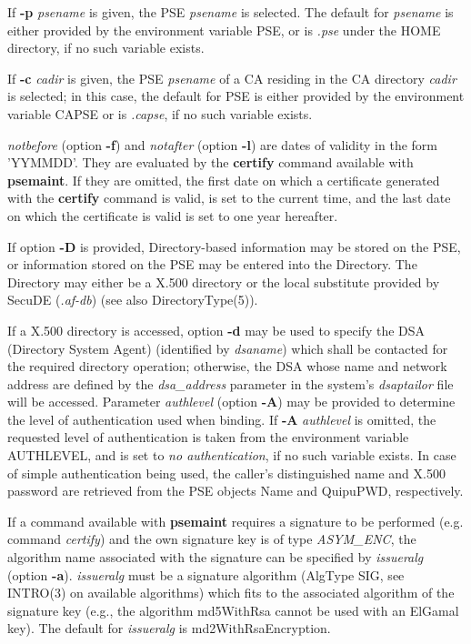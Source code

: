 If {\bf -p} {\em psename} is given, the PSE {\em psename} is selected. The default for
{\em psename} is either provided by the environment variable PSE, or is {\em .pse} under the
HOME directory, if no such variable exists.

If {\bf -c} {\em cadir} is given, the PSE {\em psename} of a CA residing in the CA directory {\em cadir}
is selected; in this case, the default for PSE is either provided by the environment
variable CAPSE or is {\em .capse}, if no such variable exists.

{\em notbefore} (option {\bf -f}) and {\em notafter} (option {\bf -l}) are dates of validity in the 
form 'YYMMDD'. They are evaluated by the {\bf certify} command available with {\bf psemaint}. 
If they are omitted, the first date on which a certificate generated with the {\bf certify} command
is valid, is set to the current time, 
and the last date on which the certificate is valid is set to one year hereafter.

If option {\bf -D} is provided, Directory-based information may be stored on the PSE, or
information stored on the PSE may be entered into the Directory.
The Directory may either be a 
X.500 directory or the local substitute provided by 
SecuDE ({\em .af-db}) (see also DirectoryType(5)).

If a X.500 directory is accessed, option {\bf -d} may be used to specify the DSA (Directory System 
Agent) 
(identified by {\em dsaname}) which shall be contacted for the required directory operation; otherwise, the DSA whose name and network address are defined by the {\em dsa\_address} parameter in the system's 
{\em dsaptailor} file will be accessed. 
Parameter {\em authlevel} (option {\bf -A}) may be provided to determine the level of authentication used when binding. If {\bf -A} {\em authlevel} is omitted, the requested 
level of authentication is taken from the environment variable AUTHLEVEL, and is set to {\em no 
authentication}, if no such variable exists.
In case of simple authentication being used, the caller's distinguished name and
X.500 password are retrieved from the PSE objects Name and QuipuPWD, respectively.

If a command available with {\bf psemaint} requires a signature to be performed (e.g. command {\em 
certify}) and the own
signature key is of type {\em ASYM\_ENC}, the algorithm name associated with the signature can be 
specified by {\em issueralg} (option {\bf -a}). {\em issueralg} must be a
signature algorithm (AlgType SIG, see INTRO(3) on available algorithms) which fits to the associated 
algorithm of the signature key (e.g., the algorithm md5WithRsa cannot be used with an ElGamal key).
The default for {\em issueralg} is md2WithRsaEncryption.

